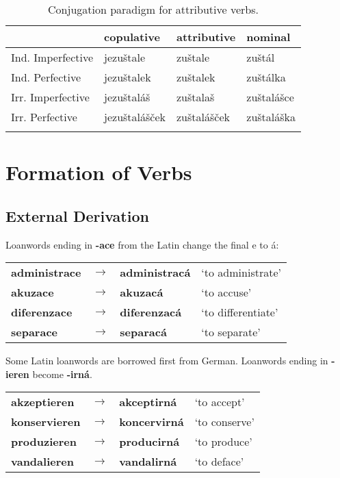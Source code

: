 \xe


\begin{table}[h!]
	\small\centering
	\caption{Conjugation paradigm for attributive verbs.}\label{att-verbs}
	\begin{tabu} to 0.9\textwidth{Y[1.3]MMM}
		\toprule\addlinespace
		&{\sc copulative}&{\sc attributive}&{\sc nominal}\\
		\midrule\addlinespace
		Ind. Imperfective&jezu\v{s}tale&zu\v{s}tale&zu\v{s}t\'al\\\addlinespace
		Ind. Perfective&jezu\v{s}talek&zu\v{s}talek&zu\v{s}t\'alka\\ 
		\addlinespace
		Irr. Imperfective&jezu\v{s}tal\'a\v{s}&zu\v{s}tala\v{s}&zu\v{s}tal\'a\v{s}ce\\\addlinespace
		Irr. Perfective&jezu\v{s}tal\'a\v{s}\v{c}ek&zu\v{s}tal\'a\v{s}\v{c}ek&zu\v{s}tal\'a\v{s}ka\\ 
		\addlinespace
		\bottomrule\addlinespace
		
	\end{tabu}
\end{table}

\section{Formation of Verbs}
\subsection{External Derivation}
\par Loanwords ending in \textbf{-ace} from the Latin change the final e to á:
\begin{table}[h!]
	\centering \small
	\begin{tabu} to 0.9
		administrace 	& $\rightarrow$ & administracá 	& `to administrate' \\
		akuzace			& $\rightarrow$ & akuzacá		& `to accuse'\\
		diferenzace		& $\rightarrow$ & diferenzacá	& `to differentiate'\\
		separace		& $\rightarrow$ & separacá		& `to separate'\\
	\end{tabu}
\end{table}
\par Some Latin loanwords are borrowed first from German. Loanwords ending in \textbf{-ieren} become \textbf{-irná}.
\begin{table}[h!]
	\centering \small
	\begin{tabu} to 0.9
		akzeptieren 	& $\rightarrow$ & akceptirná 	& `to accept' \\
		konservieren	& $\rightarrow$ & koncervirná	& `to conserve'\\
		produzieren		& $\rightarrow$ & producirná	& `to produce'\\
		vandalieren		& $\rightarrow$ & vandalirná 	& `to deface'\\
	\end{tabu}
\end{table}
